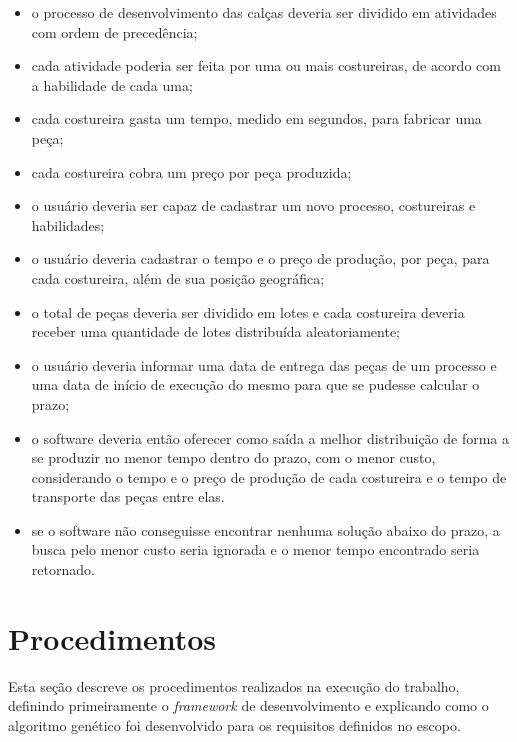 \begin{itemize}
	
	\item o processo de desenvolvimento das calças deveria ser dividido em
	atividades com ordem de precedência;
	
	\item cada atividade poderia ser feita por uma ou mais costureiras, de acordo
	com a habilidade de cada uma;
	
	\item cada costureira gasta um tempo, medido em segundos, para fabricar uma
	peça;
	
	\item cada costureira cobra um preço por peça produzida;
	
	\item o usuário deveria ser capaz de cadastrar um novo processo, costureiras e
	habilidades;
	
	\item o usuário deveria cadastrar o tempo e o preço de produção, por peça, para
	cada costureira, além de sua posição geográfica; 
	
	\item o total de peças deveria ser dividido em lotes e cada costureira deveria
	receber uma quantidade de lotes distribuída aleatoriamente;
	
	\item o usuário deveria informar uma data de entrega das peças de um processo e
	uma data de início de execução do mesmo para que se pudesse calcular o prazo;
	
	\item o software deveria então oferecer como saída a melhor distribuição de
	forma a se produzir no menor tempo dentro do prazo, com o menor custo, considerando 
	o tempo e o preço de produção de cada costureira e o tempo de transporte das peças 
	entre elas.
	
	\item se o software não conseguisse encontrar nenhuma solução abaixo do prazo, a
	busca pelo menor custo seria ignorada e o menor tempo encontrado seria retornado.
	
\end{itemize}

\section{Procedimentos}

\par Esta seção descreve os procedimentos realizados na execução do trabalho,
definindo primeiramente o \textit{framework} de desenvolvimento e explicando
como o algoritmo genético foi desenvolvido para os requisitos definidos no escopo.

